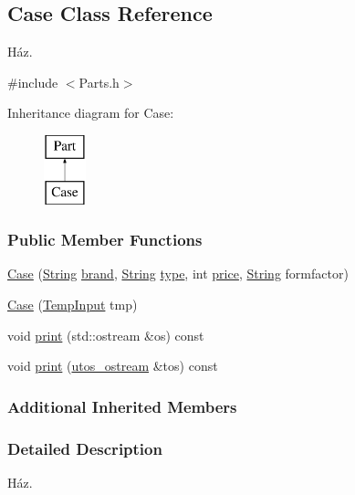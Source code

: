 \subsection{Case Class Reference}
\label{class_case}


Ház.  




{\ttfamily \#include $<$Parts.\+h$>$}

Inheritance diagram for Case\+:\begin{figure}[H]
\begin{center}
\leavevmode
\includegraphics[height=2.000000cm]{class_case}
\end{center}
\end{figure}
\subsubsection*{Public Member Functions}
\begin{DoxyCompactItemize}
\item 
\mbox{\hyperlink{class_case_a0d953adffc664636549235d729f13260}{Case}} (\mbox{\hyperlink{class_string}{String}} \mbox{\hyperlink{class_part_ae06f2fdeb7fbbdb229a7aca151f3e341}{brand}}, \mbox{\hyperlink{class_string}{String}} \mbox{\hyperlink{class_part_a101dbcc5c4b21564df7414c7eb0eae88}{type}}, int \mbox{\hyperlink{class_part_a8e71223aed1da95a974f33d8d6c91bb1}{price}}, \mbox{\hyperlink{class_string}{String}} formfactor)
\item 
\mbox{\hyperlink{class_case_a300362691710d1f9312f9d31d56ea53e}{Case}} (\mbox{\hyperlink{struct_temp_input}{Temp\+Input}} tmp)
\item 
void \mbox{\hyperlink{class_case_a9e54f42dcb7b62f1792a6475ce60aa79}{print}} (std\+::ostream \&os) const
\item 
void \mbox{\hyperlink{class_case_ae179519844b825815f4accddafae13b6}{print}} (\mbox{\hyperlink{structutos__ostream}{utos\+\_\+ostream}} \&tos) const
\end{DoxyCompactItemize}
\subsubsection*{Additional Inherited Members}


\subsubsection{Detailed Description}
Ház. 

